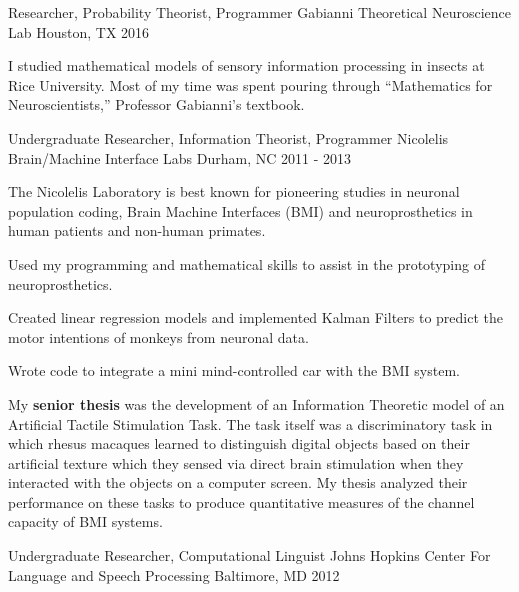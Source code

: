 \begin{cventries}
    \cventry
        {Researcher, Probability Theorist, Programmer}
        {Gabianni Theoretical Neuroscience Lab}
        {Houston, TX}
        {2016}
        {
            \begin{cvparagraph}
	        I studied mathematical models of sensory information processing in insects at Rice University. Most of my time was spent pouring through ``Mathematics for Neuroscientists,'' Professor Gabianni's textbook.
            \end{cvparagraph}
	}
    \cventry
        {Undergraduate Researcher, Information Theorist, Programmer}
        {Nicolelis Brain/Machine Interface Labs}
        {Durham, NC}
        {2011 - 2013}
        {
            \begin{cvparagraph}
                The Nicolelis Laboratory is best known for pioneering studies in neuronal population coding, Brain Machine Interfaces (BMI) and neuro\-prosthetics in human patients and non-human primates.
            \end{cvparagraph}
            \begin{cvitems}
                \item{Used my programming and mathematical skills to assist in the prototyping of neuroprosthetics.}
                \item{Created linear regression models and implemented Kalman Filters to predict the motor intentions of monkeys from neuronal data.}
                \item{Wrote code to integrate a mini mind-controlled car with the BMI system.}
            \end{cvitems}
            \begin{cvparagraph}
		    My \textbf{senior thesis} was the development of an Information Theoretic model of an Artificial Tactile Stimulation Task. The task itself was a discriminatory task in which rhesus macaques learned to distinguish digital objects based on their artificial texture which they sensed via direct brain stimulation when they interacted with the objects on a computer screen. My thesis analyzed their performance on these tasks to produce quantitative measures of the channel capacity of BMI systems.
            \end{cvparagraph}
        }
    \cventry
        {Undergraduate Researcher, Computational Linguist}
        {Johns Hopkins Center For Language and Speech Processing}
        {Baltimore, MD}
        {2012}
        {
            \begin{cvparagraph}

\end{cvparagraph}}
\end{cventries}
